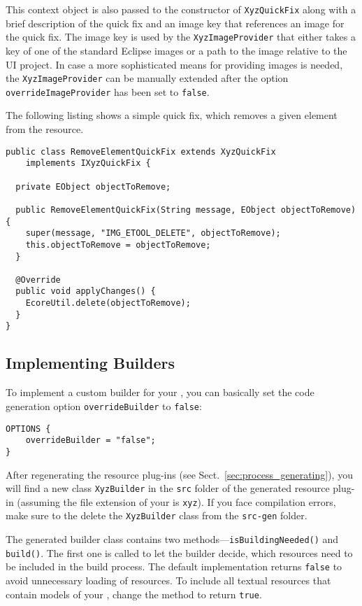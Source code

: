This context object is also passed to the constructor of \texttt{XyzQuickFix} along
with a brief description of the quick fix and an image key that references an image 
for the quick fix. The image key is used by the \texttt{XyzImageProvider} that either
takes a key of one of the standard Eclipse images or a path to the image relative to
the UI project. In case a more sophisticated means for providing images is needed, the
\texttt{XyzImageProvider} can be manually extended after the option 
\texttt{overrideImageProvider} has been set to \texttt{false}.

The following listing shows a simple quick fix, which removes a given element from
the resource.

\begin{lstlisting}
public class RemoveElementQuickFix extends XyzQuickFix
    implements IXyzQuickFix {

  private EObject objectToRemove;

  public RemoveElementQuickFix(String message, EObject objectToRemove) {
    super(message, "IMG_ETOOL_DELETE", objectToRemove);
    this.objectToRemove = objectToRemove;
  }

  @Override
  public void applyChanges() {
    EcoreUtil.delete(objectToRemove);
  }
}
\end{lstlisting}


\subsection{Implementing Builders}
\label{sec:cust_builders}

To implement a custom builder for your \DSL, you can basically set the code
generation option \texttt{overrideBuilder} to \texttt{false}:

\begin{lstlisting}
OPTIONS {
    overrideBuilder = "false";
}
\end{lstlisting}

After regenerating the resource plug-ins (see
Sect.~\ref{sec:process_generating}), you will find a new class
\texttt{XyzBuilder} in the \texttt{src} folder of the generated resource 
plug-in (assuming the file extension of your \DSL is \texttt{xyz}). If you
face compilation errors, make sure to the delete the \texttt{XyzBuilder} 
class from the \texttt{src-gen} folder.

The generated builder class contains two methods---\texttt{isBuildingNeeded()} and
\texttt{build()}. The first one is called to let the builder decide, which
resources need to be included in the build process. The default implementation
returns \texttt{false} to avoid unnecessary loading of resources. To include all
textual resources that contain models of your \DSL, change the method to return
\texttt{true}.


